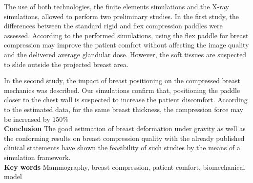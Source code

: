 \noindent
The use of both technologies, the finite elements simulations and the X-ray simulations, allowed to perform two preliminary studies. In the first study, the differences between the standard rigid and flex compression paddles were assessed. According to the performed simulations, using the flex paddle for breast compression may improve the patient comfort without affecting the image quality and the delivered average glandular dose. However, the soft tissues are suspected to slide outside the projected breast area.

\noindent
In the second study, the impact of breast positioning on the compressed breast mechanics was described. Our simulations confirm that, positioning the paddle closer to the chest wall is suspected to increase the patient discomfort. According to the estimated data, for the same breast thickness, the compression force may be increased by $150\%$ \\

\noindent
\textbf{Conclusion}
The good estimation of breast deformation under gravity as well as the conforming results on breast compression quality with the already published clinical statements have shown the feasibility of such studies by the means of a simulation framework. \\

\noindent
\textbf{Key words} Mammography, breast compression, patient comfort, biomechanical model 
